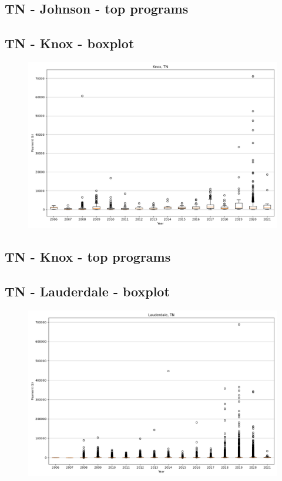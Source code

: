 \subsection*{TN - Johnson - top programs}

\newpage
\subsection*{TN - Knox - boxplot}
\begin{figure}[h]
\centering
\includegraphics[width=7in]{../output/boxplots/counties/Knox-TN_boxplot.png}
\end{figure}


\subsection*{TN - Knox - top programs}

\newpage
\subsection*{TN - Lauderdale - boxplot}
\begin{figure}[h]
\centering
\includegraphics[width=7in]{../output/boxplots/counties/Lauderdale-TN_boxplot.png}
\end{figure}


